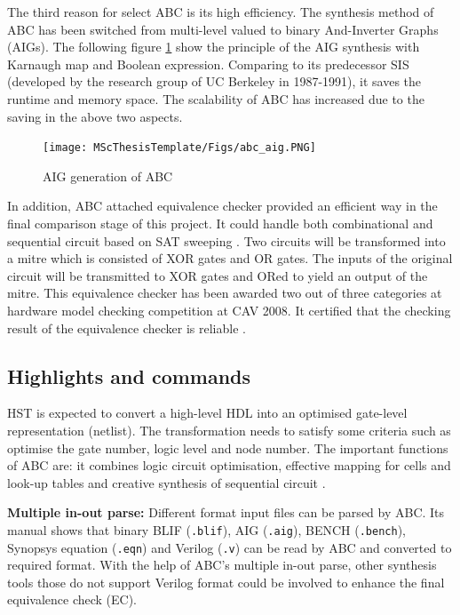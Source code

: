 The third reason for select ABC is its high efficiency. The synthesis method of ABC has been switched from multi-level valued to binary And-Inverter Graphs (AIGs). The following figure \ref{fig:abc_aig} show the principle of the AIG synthesis with Karnaugh map and Boolean expression. Comparing to its predecessor SIS (developed by the research group of UC Berkeley in 1987-1991\cite{ABC}), it saves the runtime and memory space. The scalability of ABC has increased due to the saving in the above two aspects.
\begin{figure}[htbp]
    \centering
    \texttt{[image: MScThesisTemplate/Figs/abc\_aig.PNG]}
    \caption{\footnotesize AIG generation of ABC\cite{mishchenko2006dag}}
    \label{fig:abc_aig}
\end{figure}
In addition, ABC attached equivalence checker provided an efficient way in the final comparison stage of this project. It could handle both combinational and sequential circuit based on SAT sweeping \cite{satsweep,kuehlmann2001circuit,mishchenko2006improvements}. Two circuits will be transformed into a mitre which is consisted of XOR gates and OR gates. The inputs of the original circuit will be transmitted to XOR gates and ORed to yield an output of the mitre. This equivalence checker has been awarded two out of three categories at hardware model checking competition at CAV 2008. It certified that the checking result of the equivalence checker is reliable \cite{mishchenko2006improvements}.

\subsection{Highlights and commands}
HST is expected to convert a high-level HDL into an optimised gate-level representation (netlist). The transformation needs to satisfy some criteria such as optimise the gate number, logic level and node number. The important functions of ABC are: it combines logic circuit optimisation, effective mapping for cells and look-up tables and creative synthesis of sequential circuit \cite{ABC}.

\textbf{Multiple in-out parse:} Different format input files can be parsed by ABC. Its manual shows that binary BLIF \cite{blif} (\texttt{.blif}), AIG (\texttt{.aig}), BENCH (\texttt{.bench}), Synopsys equation \cite{Synopsys} (\texttt{.eqn}) and Verilog (\texttt{.v}) can be read by ABC and converted to required format. With the help of ABC's multiple in-out parse, other synthesis tools those do not support Verilog format could be involved to enhance the final equivalence check (EC).

